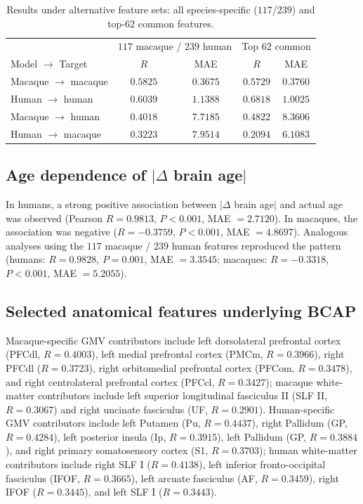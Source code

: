 \documentclass[11pt]{article}
\begin{document}
\begin{table}[h]
\centering
\caption{Results under alternative feature sets: all species-specific ($117$/$239$) and top-$62$ common features.}
\label{tab:featsets}
\begin{tabular}{lcccc}
\toprule
 & \multicolumn{2}{c}{$117$ macaque / $239$ human} & \multicolumn{2}{c}{Top $62$ common} \\
Model $\to$ Target & $R$ & MAE & $R$ & MAE \\
\midrule
Macaque $\to$ macaque & $0.5825$ & $0.3675$ & $0.5729$ & $0.3760$ \\
Human $\to$ human & $0.6039$ & $1.1388$ & $0.6818$ & $1.0025$ \\
Macaque $\to$ human & $0.4018$ & $7.7185$ & $0.4822$ & $8.3606$ \\
Human $\to$ macaque & $0.3223$ & $7.9514$ & $0.2094$ & $6.1083$ \\
\bottomrule
\end{tabular}
\end{table}

\subsection{Age dependence of $|\Delta$ brain age$|$}
In humans, a strong positive association between $|\Delta$ brain age$|$ and actual age was observed (Pearson $R = 0.9813$, $P < 0.001$, MAE $= 2.7120$). In macaques, the association was negative ($R = -0.3759$, $P < 0.001$, MAE $= 4.8697$). Analogous analyses using the $117$ macaque / $239$ human features reproduced the pattern (humans: $R = 0.9828$, $P = 0.001$, MAE $= 3.3545$; macaques: $R = -0.3318$, $P < 0.001$, MAE $= 5.2055$).

\subsection{Selected anatomical features underlying BCAP}
Macaque-specific GMV contributors include left dorsolateral prefrontal cortex (PFCdl, $R = 0.4003$), left medial prefrontal cortex (PMCm, $R = 0.3966$), right PFCdl ($R = 0.3723$), right orbitomedial prefrontal cortex (PFCom, $R = 0.3478$), and right centrolateral prefrontal cortex (PFCcl, $R = 0.3427$); macaque white-matter contributors include left superior longitudinal fasciculus II (SLF II, $R = 0.3067$) and right uncinate fasciculus (UF, $R = 0.2901$). Human-specific GMV contributors include left Putamen (Pu, $R = 0.4437$), right Pallidum (GP, $R = 0.4284$), left posterior insula (Ip, $R = 0.3915$), left Pallidum (GP, $R = 0.3884$), and right primary somatosensory cortex (S1, $R = 0.3703$); human white-matter contributors include right SLF I ($R = 0.4138$), left inferior fronto-occipital fasciculus (IFOF, $R = 0.3665$), left arcuate fasciculus (AF, $R = 0.3459$), right IFOF ($R = 0.3445$), and left SLF I ($R = 0.3443$).
\end{document}
